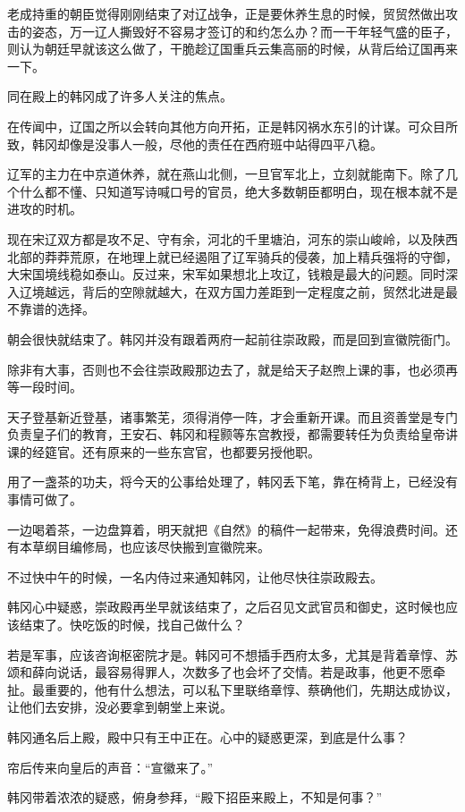 老成持重的朝臣觉得刚刚结束了对辽战争，正是要休养生息的时候，贸贸然做出攻击的姿态，万一辽人撕毁好不容易才签订的和约怎么办？而一干年轻气盛的臣子，则认为朝廷早就该这么做了，干脆趁辽国重兵云集高丽的时候，从背后给辽国再来一下。

同在殿上的韩冈成了许多人关注的焦点。

在传闻中，辽国之所以会转向其他方向开拓，正是韩冈祸水东引的计谋。可众目所致，韩冈却像是没事人一般，尽他的责任在西府班中站得四平八稳。

辽军的主力在中京道休养，就在燕山北侧，一旦官军北上，立刻就能南下。除了几个什么都不懂、只知道写诗喊口号的官员，绝大多数朝臣都明白，现在根本就不是进攻的时机。

现在宋辽双方都是攻不足、守有余，河北的千里塘泊，河东的崇山峻岭，以及陕西北部的莽莽荒原，在地理上就已经遏阻了辽军骑兵的侵袭，加上精兵强将的守御，大宋国境线稳如泰山。反过来，宋军如果想北上攻辽，钱粮是最大的问题。同时深入辽境越远，背后的空隙就越大，在双方国力差距到一定程度之前，贸然北进是最不靠谱的选择。

朝会很快就结束了。韩冈并没有跟着两府一起前往崇政殿，而是回到宣徽院衙门。

除非有大事，否则也不会往崇政殿那边去了，就是给天子赵煦上课的事，也必须再等一段时间。

天子登基新近登基，诸事繁芜，须得消停一阵，才会重新开课。而且资善堂是专门负责皇子们的教育，王安石、韩冈和程颢等东宫教授，都需要转任为负责给皇帝讲课的经筵官。还有原来的一些东宫官，也都要另授他职。

用了一盏茶的功夫，将今天的公事给处理了，韩冈丢下笔，靠在椅背上，已经没有事情可做了。

一边喝着茶，一边盘算着，明天就把《自然》的稿件一起带来，免得浪费时间。还有本草纲目编修局，也应该尽快搬到宣徽院来。

不过快中午的时候，一名内侍过来通知韩冈，让他尽快往崇政殿去。

韩冈心中疑惑，崇政殿再坐早就该结束了，之后召见文武官员和御史，这时候也应该结束了。快吃饭的时候，找自己做什么？

若是军事，应该咨询枢密院才是。韩冈可不想插手西府太多，尤其是背着章惇、苏颂和薛向说话，最容易得罪人，次数多了也会坏了交情。若是政事，他更不愿牵扯。最重要的，他有什么想法，可以私下里联络章惇、蔡确他们，先期达成协议，让他们去安排，没必要拿到朝堂上来说。

韩冈通名后上殿，殿中只有王中正在。心中的疑惑更深，到底是什么事？

帘后传来向皇后的声音：“宣徽来了。”

韩冈带着浓浓的疑惑，俯身参拜，“殿下招臣来殿上，不知是何事？”

